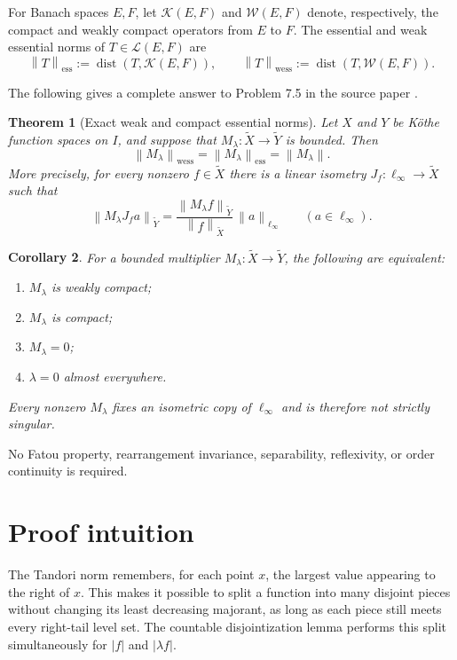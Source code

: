 \documentclass[11pt]{article}
\newtheorem{theorem}{Theorem}[section]
\newtheorem{corollary}[theorem]{Corollary}
\theoremstyle{remark}
\newcommand{\dist}{\operatorname{dist}}
\newcommand{\K}{\mathcal K}
\newcommand{\W}{\mathcal W}
\newcommand{\Lin}{\mathcal L}
\newcommand{\tX}{\widetilde X}
\newcommand{\tY}{\widetilde Y}
\newcommand{\norm}[1]{\left\lVert #1\right\rVert}
\begin{document}
For Banach spaces $E,F$, let $\K(E,F)$ and $\W(E,F)$ denote, respectively,
the compact and weakly compact operators from $E$ to $F$.  The essential and
weak essential norms of $T\in\Lin(E,F)$ are
\[
 \norm{T}_{\mathrm{ess}}:=\dist(T,\K(E,F)),\qquad
 \norm{T}_{\mathrm{wess}}:=\dist(T,\W(E,F)).
\]

The following gives a complete answer to Problem 7.5 in the source paper
\cite[Problem 7.5]{KT}.

\begin{theorem}[Exact weak and compact essential norms]\label{thm:main}
Let $X$ and $Y$ be K\"othe function spaces on $I$, and suppose that
$M_\lambda:\tX\to\tY$ is bounded.  Then
\begin{equation}\label{eq:main}
 \norm{M_\lambda}_{\mathrm{wess}}
 =\norm{M_\lambda}_{\mathrm{ess}}
 =\norm{M_\lambda}.
\end{equation}
More precisely, for every nonzero $f\in\tX$ there is a linear isometry
$J_f:\ell_\infty\to\tX$ such that
\begin{equation}\label{eq:scaled-isometry}
 \norm{M_\lambda J_f a}_{\tY}
 =\frac{\norm{M_\lambda f}_{\tY}}{\norm{f}_{\tX}}\,
   \norm{a}_{\ell_\infty}
 \qquad(a\in\ell_\infty).
\end{equation}
\end{theorem}

\begin{corollary}\label{cor:characterization}
For a bounded multiplier $M_\lambda:\tX\to\tY$, the following are equivalent:
\begin{enumerate}[label=\textup{(\roman*)},nosep]
 \item $M_\lambda$ is weakly compact;
 \item $M_\lambda$ is compact;
 \item $M_\lambda=0$;
 \item $\lambda=0$ almost everywhere.
\end{enumerate}
Every nonzero $M_\lambda$ fixes an isometric copy of $\ell_\infty$ and is
therefore not strictly singular.
\end{corollary}

No Fatou property, rearrangement invariance, separability, reflexivity, or
order continuity is required.

\section{Proof intuition}

The Tandori norm remembers, for each point $x$, the largest value appearing
to the right of $x$.  This makes it possible to split a function into many
disjoint pieces without changing its least decreasing majorant, as long as
each piece still meets every right-tail level set.  The countable
disjointization lemma performs this split simultaneously for $|f|$ and
$|\lambda f|$.
\end{document}
